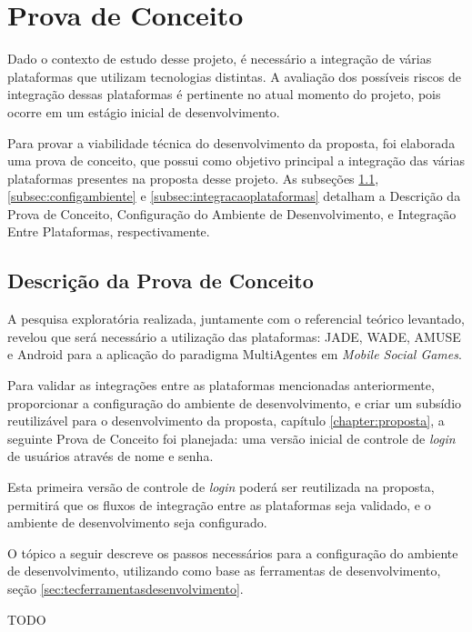 \section{Prova de Conceito}
\label{sec:provaconceito}

Dado o contexto de estudo desse projeto, é necessário a integração de várias
plataformas que utilizam tecnologias distintas. A avaliação dos possíveis
riscos de integração dessas plataformas é pertinente no atual momento do
projeto, pois ocorre em um estágio inicial de desenvolvimento.

Para provar a viabilidade técnica do desenvolvimento da proposta, foi elaborada
uma prova de conceito, que possui como objetivo principal a integração das
várias plataformas presentes na proposta desse projeto. As subseções
\ref{subsec:descconceito}, \ref{subsec:configambiente} e
\ref{subsec:integracaoplataformas} detalham a Descrição da Prova de Conceito,
Configuração do Ambiente de Desenvolvimento, e Integração Entre Plataformas,
respectivamente.

  \subsection{Descrição da Prova de Conceito}
  \label{subsec:descconceito}
  A pesquisa exploratória realizada, juntamente com o referencial teórico
  levantado, revelou que será necessário a utilização das plataformas: JADE,
  WADE, AMUSE e Android para a aplicação do paradigma MultiAgentes em
  \textit{Mobile Social Games}.

  Para validar as integrações entre as plataformas mencionadas anteriormente,
  proporcionar a configuração do ambiente de desenvolvimento, e criar um
  subsídio reutilizável para o desenvolvimento da proposta, capítulo
  \ref{chapter:proposta}, a seguinte Prova de Conceito foi planejada: uma
  versão inicial de controle de \textit{login} de usuários através de nome e
  senha.

  Esta primeira versão de controle de \textit{login} poderá ser reutilizada na
  proposta, permitirá que os fluxos de integração entre as plataformas seja
  validado, e o ambiente de desenvolvimento seja configurado.

  O tópico a seguir descreve os passos necessários para a configuração do
  ambiente de desenvolvimento, utilizando como base as ferramentas de
  desenvolvimento, seção \ref{sec:tecferramentasdesenvolvimento}.

  TODO

